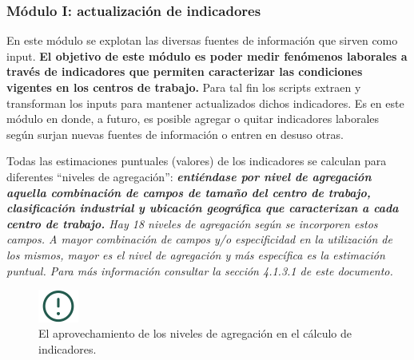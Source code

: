 \documentclass[
]{article}
\begin{document}
\hypertarget{moduloIexplicaciongeneral}{%
\subsubsection*{Módulo I: actualización de indicadores}\label{moduloIexplicaciongeneral}}

En este módulo se explotan las diversas fuentes de información que sirven como input. \textbf{El objetivo de este módulo es poder medir fenómenos laborales a través de indicadores que permiten caracterizar las condiciones vigentes en los centros de trabajo.} Para tal fin los scripts extraen y transforman los inputs para mantener actualizados dichos indicadores. Es en este módulo en donde, a futuro, es posible agregar o quitar indicadores laborales según surjan nuevas fuentes de información o entren en desuso otras.

Todas las estimaciones puntuales (valores) de los indicadores se calculan para diferentes ``niveles de agregación'': \emph{\textbf{entiéndase por nivel de agregación aquella combinación de campos de tamaño del centro de trabajo, clasificación industrial y ubicación geográfica que caracterizan a cada centro de trabajo.} Hay 18 niveles de agregación según se incorporen estos campos. A mayor combinación de campos y/o especificidad en la utilización de los mismos, mayor es el nivel de agregación y más específica es la estimación puntual. Para más información consultar la sección 4.1.3.1 de este documento.}

\begin{figure}
\includegraphics[width=50px,style="float:left; background-color: #f5f5f5; padding-right:1em"]{images-1/important-icon} \caption{El aprovechamiento de los niveles de agregación en el cálculo de indicadores.}\label{fig:utilidadestimacionespuntuales}
\end{figure}
\end{document}
